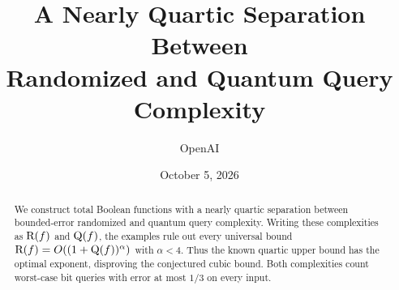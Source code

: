 \documentclass[11pt]{article}
\title{A Nearly Quartic Separation Between\texorpdfstring{\\}{ }Randomized and Quantum Query Complexity}
\author{OpenAI}
\date{October 5, 2026}
\begin{document}
\maketitle
\begin{abstract}
We construct total Boolean functions with a nearly quartic separation
between bounded-error randomized and quantum query complexity.
Writing these complexities as $\mathrm R(f)$ and $\mathrm Q(f)$, the examples rule
out every universal bound $\mathrm R(f)=O((1+\mathrm Q(f))^\alpha)$ with
$\alpha<4$. Thus the known quartic upper bound has the optimal
exponent, disproving the conjectured cubic bound. Both complexities
count worst-case bit queries with error at most $1/3$ on every input.
\end{abstract}





\appendix



\end{document}
